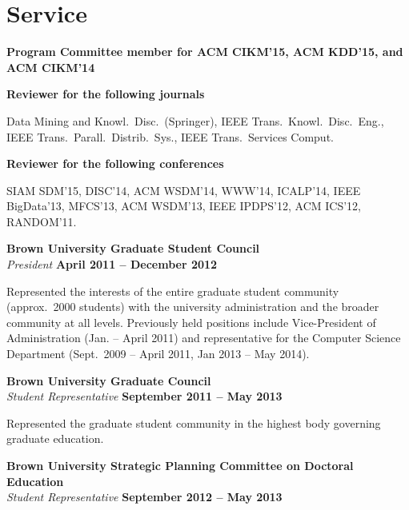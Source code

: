 \documentclass[margin,line]{resume}
\begin{document}
\section{\sc Service}
{\bf Program Committee member for ACM CIKM'15, ACM KDD'15, and ACM CIKM'14}

{\bf Reviewer for the following journals} 
\begin{list2}
\vspace*{.05in}
\item Data Mining and Knowl.~Disc.~(Springer), IEEE Trans.~Knowl.~Disc.~Eng., IEEE
Trans.~Parall.~Distrib.~Sys., IEEE Trans.~Services Comput.
\end{list2}

{\bf Reviewer for the following conferences}
\begin{list2}
\vspace*{.05in}
\item SIAM SDM'15, DISC'14, ACM WSDM'14, WWW'14, ICALP'14, IEEE BigData'13,
	MFCS'13, ACM WSDM'13, IEEE IPDPS'12, ACM ICS'12, RANDOM'11.
\end{list2}

{\bf Brown University Graduate Student Council}\\
{\em President} \hfill {\bf April 2011 -- December 2012}

\begin{list2}
\vspace*{.05in}
\item Represented the interests of the entire graduate student community
  (approx.~2000 students) with the university administration and the broader
  community at all levels. Previously held positions include Vice-President of
  Administration (Jan. -- April 2011) and representative for the Computer Science
  Department (Sept.~2009 -- April 2011, Jan 2013 -- May 2014).
\end{list2}

{\bf Brown University Graduate Council}\\
{\em Student Representative} \hfill {\bf September 2011 -- May 2013}

\begin{list2}
\vspace*{.05in}
\item Represented the graduate student community in the highest
  body governing graduate education.
\end{list2}

{\bf Brown University Strategic Planning Committee on Doctoral Education}\\
{\em Student Representative} \hfill {\bf September 2012 -- May 2013}
\end{document}
